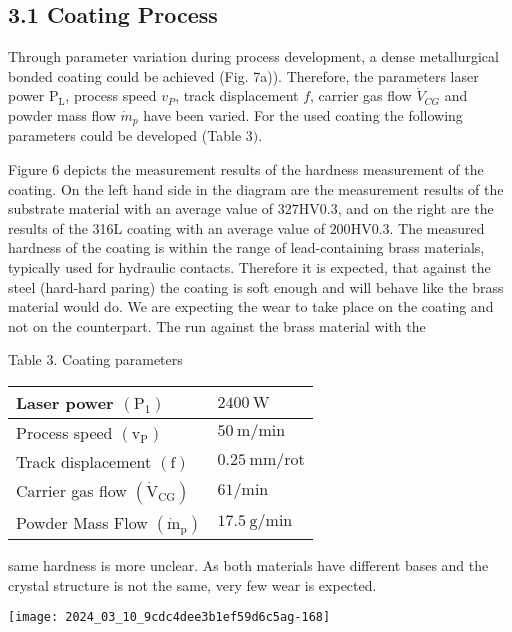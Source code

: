 \documentclass[10pt]{article}
\begin{document}
\subsection*{3.1 Coating Process}
Through parameter variation during process development, a dense metallurgical bonded coating could be achieved (Fig. 7a)). Therefore, the parameters laser power $\mathrm{P}_{\mathrm{L}}$, process speed $v_{P}$, track displacement $f$, carrier gas flow $\dot{V}_{C G}$ and powder mass flow $\dot{m}_{p}$ have been varied. For the used coating the following parameters could be developed (Table $3)$.

Figure 6 depicts the measurement results of the hardness measurement of the coating. On the left hand side in the diagram are the measurement results of the substrate material with an average value of $327 \mathrm{HV} 0.3$, and on the right are the results of the 316L coating with an average value of $200 \mathrm{HV} 0.3$. The measured hardness of the coating is within the range of lead-containing brass materials, typically used for hydraulic contacts. Therefore it is expected, that against the steel (hard-hard paring) the coating is soft enough and will behave like the brass material would do. We are expecting the wear to take place on the coating and not on the counterpart. The run against the brass material with the

Table 3. Coating parameters

\begin{center}
\begin{tabular}{l|l}
\hline
Laser power $\left(\mathrm{P}_{1}\right)$ & $2400 \mathrm{~W}$ \\
\hline
Process speed $\left(\mathrm{v}_{\mathrm{P}}\right)$ & $50 \mathrm{~m} / \mathrm{min}$ \\
\hline
Track displacement $(\mathrm{f})$ & $0.25 \mathrm{~mm} / \mathrm{rot}$ \\
\hline
Carrier gas flow $\left(\dot{\mathrm{V}}_{\mathrm{CG}}\right)$ & $61 / \mathrm{min}$ \\
\hline
Powder Mass Flow $\left(\dot{\mathrm{m}}_{\mathrm{p}}\right)$ & $17.5 \mathrm{~g} / \mathrm{min}$ \\
\hline
\end{tabular}
\end{center}

same hardness is more unclear. As both materials have different bases and the crystal structure is not the same, very few wear is expected.

\begin{center}
\texttt{[image: 2024\_03\_10\_9cdc4dee3b1ef59d6c5ag-168]}
\end{center}
\end{document}
